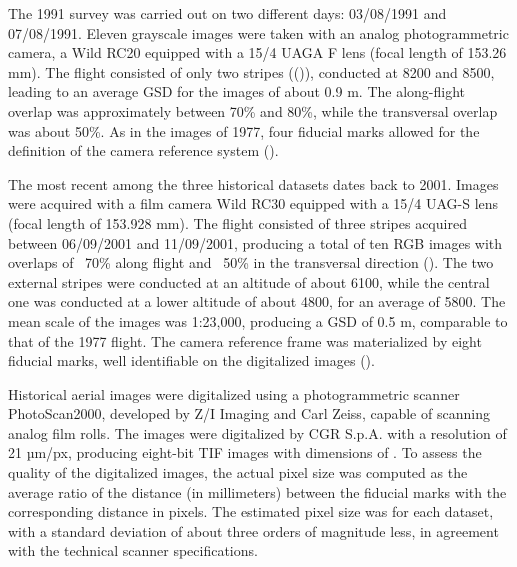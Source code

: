 The 1991 survey was carried out on two different days: 03/08/1991 and 07/08/1991.
Eleven grayscale images were taken with an analog photogrammetric camera, a Wild RC20
equipped with a 15/4 UAGA F lens (focal length of 153.26 mm). The flight consisted of only
two stripes (()), conducted at \SI{8200}{\masl} and \SI{8500}{\masl}, leading to an average
GSD for the images of about 0.9 m. The along-flight overlap was approximately between
70\% and 80\%, while the transversal overlap was about 50\%. As in the images of 1977, four
fiducial marks allowed for the definition of the camera reference system ().

The most recent among the three historical datasets dates back to 2001. Images were
acquired with a film camera Wild RC30 equipped with a 15/4 UAG-S lens (focal length
of 153.928 mm). The flight consisted of three stripes acquired between 06/09/2001 and
11/09/2001, producing a total of ten RGB images with overlaps of ~70\% along flight and
~50\% in the transversal direction (). The two external stripes were conducted at an
altitude of about \SI{6100}{\masl}, while the central one was conducted at a lower altitude of
about \SI{4800}{\masl}, for an average of \SI{5800}{\masl}. The mean scale of the images was 1:23,000, producing a GSD of 0.5 m, comparable to that of the 1977 flight. 
The camera reference frame was materialized by eight fiducial marks, well identifiable on the digitalized images ().

Historical aerial images were digitalized using a photogrammetric scanner PhotoScan2000, developed by Z/I Imaging and Carl Zeiss, capable of scanning analog film rolls. 
The images were digitalized by CGR S.p.A. with a resolution of 21 µm/px, producing eight-bit TIF 
images with dimensions of . 
To assess the quality of the digitalized images, the actual pixel size was computed as the average ratio of the distance (in millimeters) between the fiducial marks with the corresponding distance in pixels. 
The estimated pixel size was  for each dataset, with a standard deviation of about three orders of magnitude less, in agreement with the technical scanner specifications.

